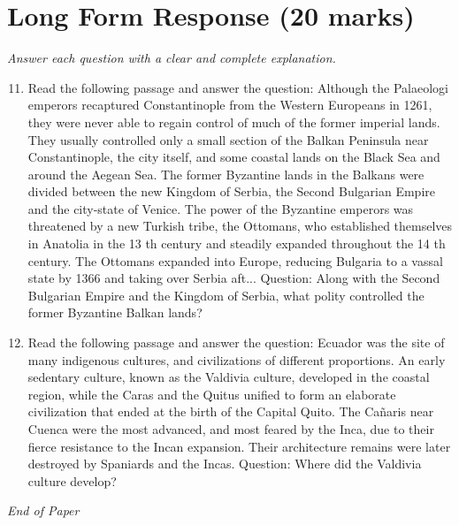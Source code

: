 \documentclass[12pt]{article}
\begin{document}
\section*{Long Form Response (20 marks)}
\textit{Answer each question with a clear and complete explanation.}
\begin{enumerate}[label=\arabic*.]
\setcounter{enumi}{10}
\item Read the following passage and answer the question: Although the Palaeologi emperors recaptured Constantinople from the Western Europeans in 1261, they were never able to regain control of much of the former imperial lands. They usually controlled only a small section of the Balkan Peninsula near Constantinople, the city itself, and some coastal lands on the Black Sea and around the Aegean Sea. The former Byzantine lands in the Balkans were divided between the new Kingdom of Serbia, the Second Bulgarian Empire and the city-state of Venice. The power of the Byzantine emperors was threatened by a new Turkish tribe, the Ottomans, who established themselves in Anatolia in the 13 th century and steadily expanded throughout the 14 th century. The Ottomans expanded into Europe, reducing Bulgaria to a vassal state by 1366 and taking over Serbia aft... Question: Along with the Second Bulgarian Empire and the Kingdom of Serbia, what polity controlled the former Byzantine Balkan lands?
\item Read the following passage and answer the question: Ecuador was the site of many indigenous cultures, and civilizations of different proportions. An early sedentary culture, known as the Valdivia culture, developed in the coastal region, while the Caras and the Quitus unified to form an elaborate civilization that ended at the birth of the Capital Quito. The Cañaris near Cuenca were the most advanced, and most feared by the Inca, due to their fierce resistance to the Incan expansion. Their architecture remains were later destroyed by Spaniards and the Incas. Question: Where did the Valdivia culture develop?
\end{enumerate}

\vfill
\noindent\textit{End of Paper}
\end{document}
